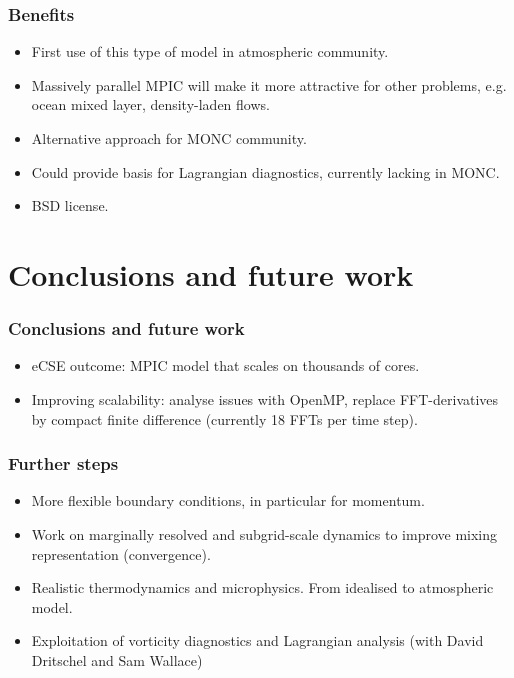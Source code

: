 \documentclass{beamer}
\def\oran#1{\color{orange} #1}
\def\gr#1{\color{dark_green} #1}
\def\re#1{\color{red}   #1}
\def\bl#1{\color{blue}  #1}
\def\pu#1{\color{purple} #1}
\begin{document}
\begin{frame}
\frametitle{Benefits}

\begin{itemize}
\item First use of this type of model in atmospheric community.
\item Massively parallel MPIC will make it more attractive for {\pu other problems}, e.g. ocean mixed layer, density-laden flows.
\item {\bl Alternative approach} for MONC community.
\item Could provide basis for Lagrangian diagnostics, currently {\re lacking in MONC}.
\item {\gr BSD} license.
\end{itemize}

\end{frame}


\section{Conclusions and future work}

\begin{frame}
\frametitle{Conclusions and future work}

\begin{itemize}
\item eCSE outcome: MPIC model that scales on thousands of cores.
\item Improving scalability: analyse issues with OpenMP, replace FFT-derivatives by compact finite difference (currently 18 FFTs per time step).  
\end{itemize}

\end{frame}


\begin{frame}
\frametitle{Further steps}

\vspace{0.2cm}
\begin{itemize}
\item More flexible {\pu boundary conditions}, in particular for momentum.
\item Work on {\re marginally resolved and subgrid-scale dynamics} to improve mixing representation (convergence).
\item Realistic {\bl thermodynamics} and {\bl microphysics}. From idealised to atmospheric model.
\item Exploitation of {\oran vorticity diagnostics} and {\oran Lagrangian analysis} (with David Dritschel and Sam Wallace)
\end{itemize}

\centering

\end{frame}
\end{document}
